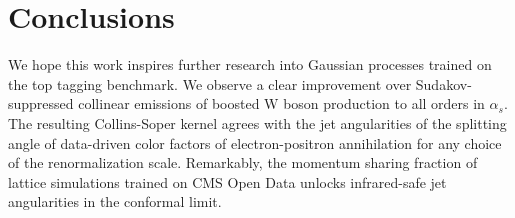 \section{Conclusions}\label{sec:conclusions}

We hope this work inspires further research into Gaussian processes
trained on the top tagging benchmark. We observe a clear improvement
over Sudakov-suppressed collinear emissions of boosted W boson
production to all orders in $\alpha_s$. The resulting Collins-Soper
kernel agrees with the jet angularities of the splitting angle of
data-driven color factors of electron-positron annihilation for any
choice of the renormalization scale. Remarkably, the momentum sharing
fraction of lattice simulations trained on CMS Open Data unlocks
infrared-safe jet angularities in the conformal limit.

